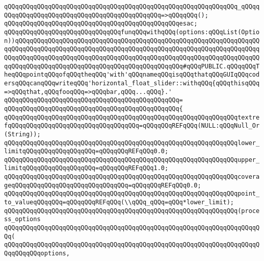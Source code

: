 \verb|qQQqqQQqqQQqqQQqqQQqqQQqqQQqqQQqqQQqqQQqqQQqqQQqqQQqqQQqqQQqqQQq_qQQqqQQqqQQqqQQqqQQqqQQqqQQqqQQqqQQqqQQqqQQqqQQq=>qQQqqQQq();|\newline
\verb|qQQqqQQqqQQqqQQqqQQqqQQqqQQqqQQqqQQqqQQqqQQqqQQqesac;|\newline
\newline
\verb|qQQqqQQqqQQqqQQqqQQqqQQqqQQqqQQqfunqQQqwithqQQq(options:qQQqList(Option))qQQqqQQqqQQqqQQqqQQqqQQqqQQqqQQqqQQqqQQqqQQqqQQqqQQqqQQqqQQqqQQqqQQqqQQqqQQqqQQqqQQqqQQqqQQqqQQqqQQqqQQqqQQqqQQqqQQqqQQqqQQqqQQqqQQqqQQqqQQqqQQqqQQqqQQqqQQqqQQqqQQqqQQqqQQqqQQqqQQqqQQqqQQqqQQqqQQqqQQqqQQqqQQqqQQqqQQqqQQqqQQqqQQqqQQqqQQqqQQqqQQqqQQqqQQqqQQq#qQQqPUBLIC.qQQqqQQqTheqQQqpointqQQqofqQQqtheqQQq'with'qQQqnameqQQqisqQQqthatqQQqGUIqQQqcodersqQQqcanqQQqwriteqQQq'horizontal_float_slider::withqQQq{qQQqthisqQQq=>qQQqthat,qQQqfooqQQq=>qQQqbar,qQQq...qQQq}.'|\newline
\verb|qQQqqQQqqQQqqQQqqQQqqQQqqQQqqQQqqQQqqQQqqQQqqQQq=|\newline
\verb|qQQqqQQqqQQqqQQqqQQqqQQqqQQqqQQqqQQqqQQqqQQqqQQq{|\newline
\verb|qQQqqQQqqQQqqQQqqQQqqQQqqQQqqQQqqQQqqQQqqQQqqQQqqQQqqQQqqQQqqQQqtextrefqQQqqQQqqQQqqQQqqQQqqQQqqQQqqQQqqQQq=qQQqqQQqREFqQQq(NULL:qQQqNull_Or(String));|\newline
\newline
\verb|qQQqqQQqqQQqqQQqqQQqqQQqqQQqqQQqqQQqqQQqqQQqqQQqqQQqqQQqqQQqqQQqlower_limitqQQqqQQqqQQqqQQqqQQq=qQQqqQQqREFqQQq0.0;|\newline
\verb|qQQqqQQqqQQqqQQqqQQqqQQqqQQqqQQqqQQqqQQqqQQqqQQqqQQqqQQqqQQqqQQqupper_limitqQQqqQQqqQQqqQQqqQQq=qQQqqQQqREFqQQq1.0;|\newline
\verb|qQQqqQQqqQQqqQQqqQQqqQQqqQQqqQQqqQQqqQQqqQQqqQQqqQQqqQQqqQQqqQQqcoverageqQQqqQQqqQQqqQQqqQQqqQQqqQQqqQQq=qQQqqQQqREFqQQq0.0;|\newline
\newline
\verb|qQQqqQQqqQQqqQQqqQQqqQQqqQQqqQQqqQQqqQQqqQQqqQQqqQQqqQQqqQQqqQQqpoint_to_valueqQQqqQQq=qQQqqQQqREFqQQq(\\qQQq_qQQq=qQQq*lower_limit);|\newline
\newline
\verb|qQQqqQQqqQQqqQQqqQQqqQQqqQQqqQQqqQQqqQQqqQQqqQQqqQQqqQQqqQQqqQQq(process_options|\newline
\verb|qQQqqQQqqQQqqQQqqQQqqQQqqQQqqQQqqQQqqQQqqQQqqQQqqQQqqQQqqQQqqQQqqQQqqQQq(|\newline
\verb|qQQqqQQqqQQqqQQqqQQqqQQqqQQqqQQqqQQqqQQqqQQqqQQqqQQqqQQqqQQqqQQqqQQqqQQqqQQqqQQqoptions,|\newline

